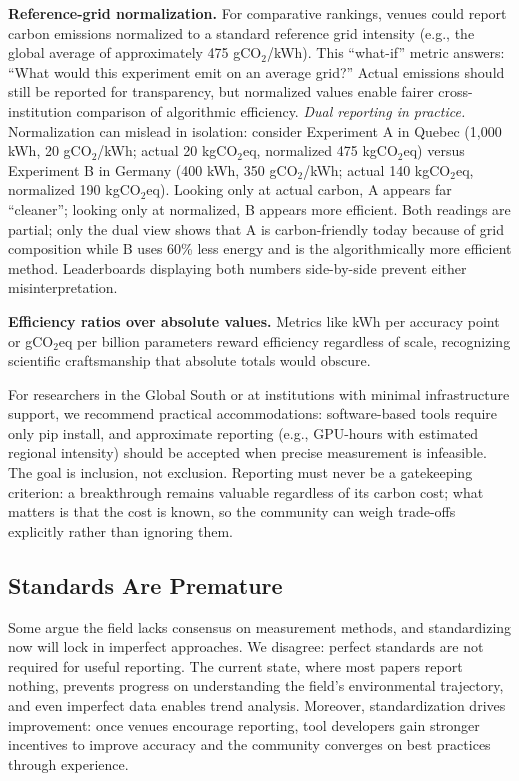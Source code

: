 \documentclass{article}
\theoremstyle{plain}
\theoremstyle{definition}
\theoremstyle{remark}
\begin{document}
\textbf{Reference-grid normalization.} For comparative rankings, venues could report carbon emissions normalized to a standard reference grid intensity (e.g., the global average of approximately 475 gCO$_2$/kWh). This ``what-if'' metric answers: ``What would this experiment emit on an average grid?'' Actual emissions should still be reported for transparency, but normalized values enable fairer cross-institution comparison of algorithmic efficiency. \emph{Dual reporting in practice.} Normalization can mislead in isolation: consider Experiment A in Quebec (1{,}000 kWh, 20 gCO$_2$/kWh; actual 20 kgCO$_2$eq, normalized 475 kgCO$_2$eq) versus Experiment B in Germany (400 kWh, 350 gCO$_2$/kWh; actual 140 kgCO$_2$eq, normalized 190 kgCO$_2$eq). Looking only at actual carbon, A appears far ``cleaner''; looking only at normalized, B appears more efficient. Both readings are partial; only the dual view shows that A is carbon-friendly today because of grid composition while B uses 60\% less energy and is the algorithmically more efficient method. Leaderboards displaying both numbers side-by-side prevent either misinterpretation.

\textbf{Efficiency ratios over absolute values.} Metrics like kWh per accuracy point or gCO$_2$eq per billion parameters reward efficiency regardless of scale, recognizing scientific craftsmanship that absolute totals would obscure.

For researchers in the Global South or at institutions with minimal infrastructure support, we recommend practical accommodations: software-based tools require only pip install, and approximate reporting (e.g., GPU-hours with estimated regional intensity) should be accepted when precise measurement is infeasible. The goal is inclusion, not exclusion. Reporting must never be a gatekeeping criterion: a breakthrough remains valuable regardless of its carbon cost; what matters is that the cost is known, so the community can weigh trade-offs explicitly rather than ignoring them.

\subsection{Standards Are Premature}

Some argue the field lacks consensus on measurement methods, and standardizing now will lock in imperfect approaches. We disagree: perfect standards are not required for useful reporting. The current state, where most papers report nothing, prevents progress on understanding the field's environmental trajectory, and even imperfect data enables trend analysis. Moreover, standardization drives improvement: once venues encourage reporting, tool developers gain stronger incentives to improve accuracy and the community converges on best practices through experience.
\end{document}
